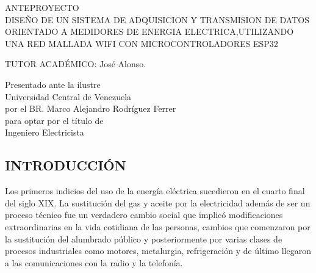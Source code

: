 \documentclass[12pt,letterpaper]{article}
\author{} %
\date{31 de julio de 2019} %
\begin{document}
	
	\renewcommand{\listfigurename}{Lista de Figuras}
	\renewcommand{\listtablename}{Lista de Tablas}
	\renewcommand{\contentsname}{Lista de Contenidos}
	\renewcommand{\figurename}{Figura}
	\renewcommand{\tablename}{Tabla}

	
\begin{center}

\vspace{3cm} ANTEPROYECTO \\

\vspace{8cm} DISEÑO DE UN SISTEMA DE ADQUISICION Y TRANSMISION DE DATOS ORIENTADO A MEDIDORES DE ENERGIA ELECTRICA,UTILIZANDO UNA RED MALLADA WIFI CON MICROCONTROLADORES ESP32
\end{center}


\vspace{6cm}

\begin{flushleft}
	TUTOR ACADÉMICO: José Alonso. \\
	
\end{flushleft}

	
\begin{flushright}
	
	
		Presentado ante la ilustre\\
		Universidad Central de Venezuela\\
		por el BR. Marco Alejandro Rodríguez Ferrer \\
		para optar por el título de \\
		Ingeniero Electricista   \\
	


\end{flushright}


\vspace{2cm}
\thispagestyle{empty}
\newpage


\begin{center}
	\section*{ INTRODUCCIÓN}
\end{center}

Los primeros indicios del uso de la energía eléctrica sucedieron en el cuarto final del siglo XIX. La sustitución del gas y aceite por la electricidad además de ser un proceso técnico fue un verdadero cambio social que implicó modificaciones extraordinarias en la vida cotidiana de las personas, cambios que comenzaron por la sustitución del alumbrado público y posteriormente por varias clases de procesos industriales como motores, metalurgia, refrigeración y de último llegaron a las comunicaciones con la radio y la telefonía.
\end{document}
